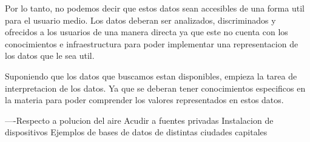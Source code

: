 Por lo tanto, no podemos decir que estos datos sean accesibles de una forma util para el usuario medio. Los datos deberan ser analizados, discriminados y ofrecidos a los usuarios de una manera directa ya que este no 
cuenta con los conocimientos e infraestructura para poder implementar una representacion de los datos que le sea util.

Suponiendo que los datos que buscamos estan disponibles, empieza la tarea de interpretacion de los datos. Ya que se deberan tener conocimientos especificos en la materia para poder comprender los valores
representados en estos datos.



----Respecto a polucion del aire 
Acudir a fuentes privadas
Instalacion de dispositivos
Ejemplos de bases de datos de distintas ciudades capitales
